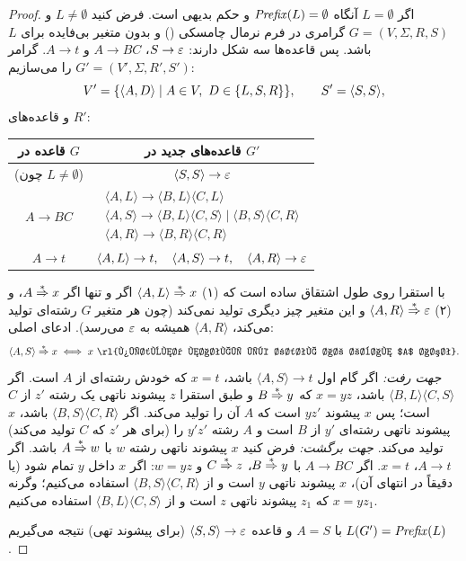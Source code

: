 \begin{proof}
اگر $L=\emptyset$ آنگاه $\mathit{Prefix}(L)=\emptyset$ و حکم بدیهی است. فرض کنید $L\neq\emptyset$ و $G=(V,\Sigma,R,S)$ گرامری در فرم نرمال چامسکی () و بدون متغیر بی‌فایده برای $L$ باشد. پس قاعده‌ها سه شکل دارند: $S\to\varepsilon$، $A\to BC$ و $A\to t$. گرامر $G'=(V',\Sigma,R',S')$ را می‌سازیم:
\[V'=\{\langle A,D\rangle\mid A\in V,\ D\in\{L,S,R\}\},\qquad S'=\langle S,S\rangle,\]
و قاعده‌های $R'$:
\begin{center}
\renewcommand{\arraystretch}{1.25}
\begin{tabular}{cc}
\toprule
قاعده در $G$ & قاعده‌های جدید در $G'$\\ \midrule
(چون $L\neq\emptyset$) & $\langle S,S\rangle\to\varepsilon$\\ \midrule
$A\to BC$ & $\begin{array}{l}\langle A,L\rangle\to\langle B,L\rangle\langle C,L\rangle\\ \langle A,S\rangle\to\langle B,L\rangle\langle C,S\rangle\mid\langle B,S\rangle\langle C,R\rangle\\ \langle A,R\rangle\to\langle B,R\rangle\langle C,R\rangle\end{array}$\\ \midrule
$A\to t$ & $\langle A,L\rangle\to t,\quad\langle A,S\rangle\to t,\quad\langle A,R\rangle\to\varepsilon$\\ \bottomrule
\end{tabular}
\end{center}
با استقرا روی طول اشتقاق ساده است که (۱) $\langle A,L\rangle\overset{*}{\Rightarrow} x$ اگر و تنها اگر $A\overset{*}{\Rightarrow} x$، و (۲) $\langle A,R\rangle\overset{*}{\Rightarrow}\varepsilon$ و این متغیر چیز دیگری تولید نمی‌کند (چون هر متغیر $G$ رشته‌ای تولید می‌کند، $\langle A,R\rangle$ همیشه به $\varepsilon$ می‌رسد). ادعای اصلی:
\[\langle A,S\rangle\der x\iff x\ \text{\rl{پیشوند ناتهی یک رشته از زبان $A$ است}}.\]
\emph{جهت رفت:} اگر گام اول $\langle A,S\rangle\to t$ باشد، $x=t$ که خودش رشته‌ای از $A$ است. اگر $\langle B,L\rangle\langle C,S\rangle$ باشد، $x=yz$ که $B\overset{*}{\Rightarrow} y$ و طبق استقرا $z$ پیشوند ناتهی یک رشته $z'$ از $C$ است؛ پس $x$ پیشوند $yz'$ است که $A$ آن را تولید می‌کند. اگر $\langle B,S\rangle\langle C,R\rangle$ باشد، $x$ پیشوند ناتهی رشته‌ای $y'$ از $B$ است و $A$ رشته $y'z'$ را (برای هر $z'$ که $C$ تولید می‌کند) تولید می‌کند.
\emph{جهت برگشت:} فرض کنید $x$ پیشوند ناتهی رشته $w$ با $A\overset{*}{\Rightarrow} w$ باشد. اگر $A\to t$، $x=t$. اگر $A\to BC$ با $B\overset{*}{\Rightarrow} y$، $C\overset{*}{\Rightarrow} z$ و $w=yz$: اگر $x$ داخل $y$ تمام شود (یا دقیقاً در انتهای آن)، $x$ پیشوند ناتهی $y$ است و از $\langle B,S\rangle\langle C,R\rangle$ استفاده می‌کنیم؛ وگرنه $x=yz_1$ که $z_1$ پیشوند ناتهی $z$ است و از $\langle B,L\rangle\langle C,S\rangle$ استفاده می‌کنیم.

با $A=S$ و قاعده $\langle S,S\rangle\to\varepsilon$ (برای پیشوند تهی) نتیجه می‌گیریم $L(G')=\mathit{Prefix}(L)$.
\end{proof}

